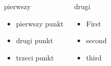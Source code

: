 \documentclass{beamer}
\begin{document}
\begin{frame}

\begin{columns}

\begin{block}{pierwszy}
\begin{itemize}
  \item<1>{pierwszy punkt}
  \item<2>{drugi punkt}
  \item<3>{trzeci punkt}
\end{itemize}
\end{block}

\begin{block}{drugi}
\begin{itemize}
  \item<1->{First}
  \item<2->{second}
  \item<3->{third}
\end{itemize}
\end{block}

\end{columns}

\end{frame}
\end{document}
